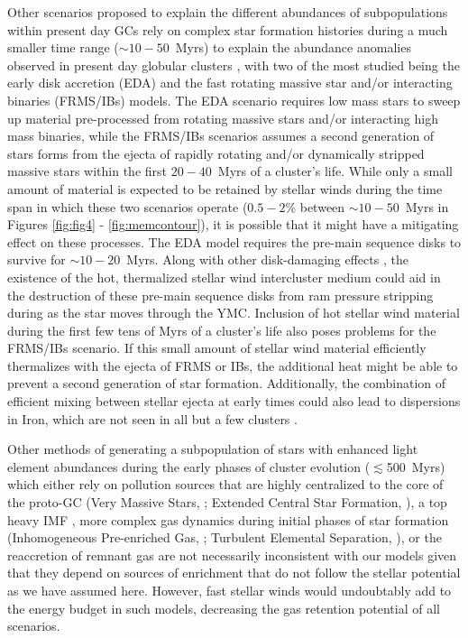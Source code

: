 \documentclass[fleqn,usenatbib]{mnras}
\begin{document}
 Other scenarios proposed to explain the different abundances of subpopulations within present day GCs rely on complex star formation histories during a much smaller time range ($\sim 10-50$~Myrs) to explain the abundance anomalies observed in present day globular clusters
 \citep{maeder2006,prantzos2006,decressin2007a,decressin2007b,charbonnel2013,krause2013,bastian2013b,cassisi2014a,henault2015,milone2016,bastian2016}, with two of the most studied being the early disk accretion (EDA) and the fast rotating massive star and/or interacting binaries (FRMS/IBs) models.  
 The EDA scenario \citep[e.g.][]{bastian2013a} requires low mass stars to sweep up material pre-processed from rotating massive stars and/or interacting high mass binaries, while the FRMS/IBs scenarios \citep[e.g.][]{deMink2009,krause2013} assumes a second generation of stars forms from the ejecta of rapidly rotating and/or dynamically stripped massive stars within the first $20-40$~Myrs of a cluster's life.
 While only a small amount of material is expected to be retained by stellar winds during the time span in which these two scenarios operate ($0.5-2$\% between $\sim 10-50$~Myrs in Figures  \ref{fig:fig4} - \ref{fig:memcontour}), it is possible that it might have a mitigating effect on these processes.
 The EDA model requires the pre-main sequence disks to survive for $\sim 10-20$~Myrs.  Along with other disk-damaging effects \citep{scally2001,dejuan2012}, the existence of the hot, thermalized stellar wind intercluster medium could aid in the destruction of these pre-main sequence disks from ram pressure stripping during as the star moves through the YMC.
 Inclusion of hot stellar wind material during the first few tens of Myrs of a cluster's life also poses problems for the FRMS/IBs scenario.  If this small amount of stellar wind material efficiently thermalizes with the ejecta of FRMS or IBs, the additional heat might be able to prevent a second generation of star formation. Additionally, the combination of efficient mixing between stellar ejecta at early times could also lead to dispersions in Iron, which are not seen in all but a few clusters \citep[e.g.][]{villanova2007}.


 Other methods of generating a subpopulation of stars with enhanced light element abundances during the early phases of cluster evolution ($\lesssim$500~Myrs) which either rely on pollution sources that are highly centralized to the core of the proto-GC (Very Massive Stars, \citealt{den2014}; Extended Central Star Formation, \citealt{prantzos2006,elmegreen2017,wunsch2017}), a top heavy IMF \citep{charbonnel2014}, more complex gas dynamics during initial phases of star formation (Inhomogeneous Pre-enriched Gas, \citealt{marcolini2009}; Turbulent Elemental Separation, \citealt{hopkins2014}), or the reaccretion of remnant gas \citep{decressin2007a,decressin2007b} are not necessarily inconsistent with our models given that they depend on sources of enrichment that do not follow the stellar potential as we have assumed here.
 However, fast stellar winds would undoubtably add to the energy budget in such models, decreasing the gas retention potential of all scenarios.
 
\end{document}
